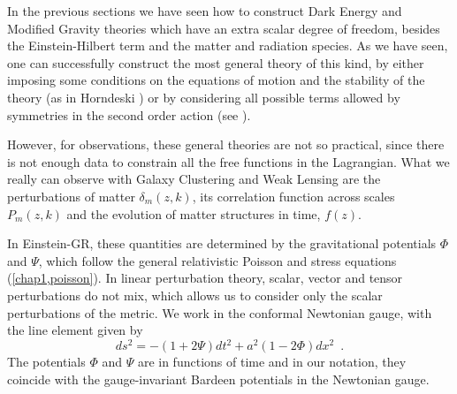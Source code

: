 In the previous sections we have seen how to construct Dark Energy and Modified Gravity theories 
which have an extra scalar degree of freedom, besides the Einstein-Hilbert term and the matter and radiation species.
As we have seen, one can successfully construct the most general theory of this kind, by either imposing
some conditions on the equations of motion and the stability of the theory (as in Horndeski \cite{horndeski}) or by considering all
possible terms allowed by symmetries in the second order action (see \cite{creminelli, gubitosi, gleyzes}).

However, for observations, these general theories are not so practical, since there is not enough data to constrain
all the free functions in the Lagrangian. What we really can observe with Galaxy Clustering and Weak Lensing 
are the perturbations of matter $\delta_m(z,k)$, its correlation function across scales $P_m(z,k)$ and the
evolution of matter structures in time, $f(z)$.

In Einstein-GR, these quantities are determined by the gravitational potentials $\Phi$ and $\Psi$, which follow 
the general relativistic Poisson and stress equations (\cref{chap1,poisson}). 
In linear perturbation theory, scalar, vector and tensor perturbations
do not mix, which allows us to consider only the scalar perturbations of the metric. 
We work in the conformal Newtonian gauge, with the
line element given by 
\begin{equation}
ds^{2}=-(1+2\Psi)dt^{2}+a^{2}(1-2\Phi)dx^{2}\,\,\,.
\end{equation}
The potentials $\Phi$ and $\Psi$ are in functions of time and in our notation, they coincide
with the gauge-invariant Bardeen potentials in the Newtonian gauge.



